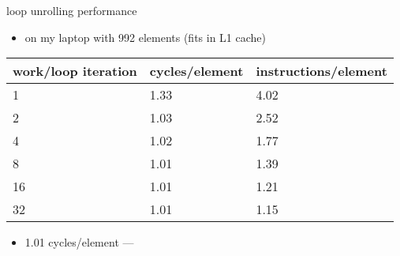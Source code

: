 \begin{frame}{loop unrolling performance}
    \begin{itemize}
        \item on my laptop with 992 elements (fits in L1 cache)
    \end{itemize}
    \begin{tabular}{lll}
        work/loop iteration & cycles/element & instructions/element\\ \hline
        1              & 1.33 & 4.02 \\
        2              & 1.03 & 2.52 \\
        4              & 1.02 & 1.77 \\
        8              & 1.01 & 1.39 \\
        16             & 1.01 & 1.21 \\
        32             & 1.01 & 1.15 \\
    \end{tabular}
    \begin{itemize}
        \item 1.01 cycles/element --- 
    \end{itemize}
\end{frame}
